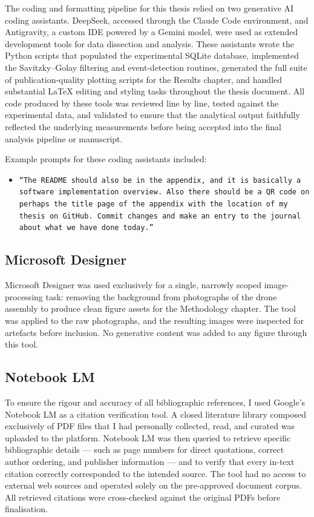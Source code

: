 The coding and formatting pipeline for this thesis relied on two generative AI coding assistants. DeepSeek, accessed through the Claude Code environment, and Antigravity, a custom IDE powered by a Gemini model, were used as extended development tools for data dissection and analysis. These assistants wrote the Python scripts that populated the experimental SQLite database, implemented the Savitzky--Golay filtering and event-detection routines, generated the full suite of publication-quality plotting scripts for the Results chapter, and handled substantial LaTeX editing and styling tasks throughout the thesis document. All code produced by these tools was reviewed line by line, tested against the experimental data, and validated to ensure that the analytical output faithfully reflected the underlying measurements before being accepted into the final analysis pipeline or manuscript.

Example prompts for these coding assistants included:
\begin{itemize}
    \item \texttt{``The README should also be in the appendix, and it is basically a software implementation overview. Also there should be a QR code on perhaps the title page of the appendix with the location of my thesis on GitHub. Commit changes and make an entry to the journal about what we have done today.''}
\end{itemize}

\subsection{Microsoft Designer}

Microsoft Designer was used exclusively for a single, narrowly scoped image-processing task: removing the background from photographs of the drone assembly to produce clean figure assets for the Methodology chapter. The tool was applied to the raw photographs, and the resulting images were inspected for artefacts before inclusion. No generative content was added to any figure through this tool.

\subsection{Notebook LM}

To ensure the rigour and accuracy of all bibliographic references, I used Google's Notebook LM as a citation verification tool. A closed literature library composed exclusively of PDF files that I had personally collected, read, and curated was uploaded to the platform. Notebook LM was then queried to retrieve specific bibliographic details --- such as page numbers for direct quotations, correct author ordering, and publisher information --- and to verify that every in-text citation correctly corresponded to the intended source. The tool had no access to external web sources and operated solely on the pre-approved document corpus. All retrieved citations were cross-checked against the original PDFs before finalisation.


